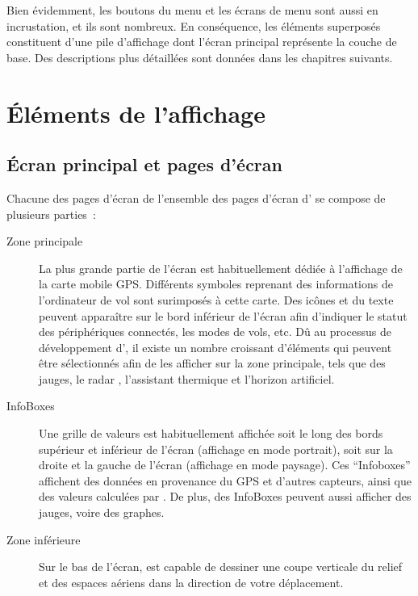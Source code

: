 Bien évidemment, les boutons du menu et les écrans de menu sont aussi en incrustation,
et ils sont nombreux. En conséquence, les éléments superposés constituent d'une pile d'affichage dont
l'écran principal représente la couche de base. Des descriptions plus détaillées sont
données dans les chapitres suivants.

\section{Éléments de l'affichage}
\subsection*{Écran principal et pages d'écran}
Chacune des pages d'écran de l'ensemble des pages d'écran d'\xc{} se compose de plusieurs
parties~:
\begin{description}
\item[Zone principale] La plus grande partie de l'écran est habituellement dédiée à l'affichage
de la carte mobile GPS. Différents symboles reprenant des informations de l'ordinateur de vol sont surimposés
à cette carte. Des icônes et du texte peuvent apparaître sur le bord inférieur de l'écran
afin d'indiquer le statut des périphériques connectés, les modes de vols, etc.
Dû au processus de développement d'\xc{}, il existe un nombre croissant
d'éléments qui peuvent être sélectionnés afin de les afficher sur la zone principale, tels que des jauges,
le radar \fl, l'assistant thermique et l'horizon artificiel.
\item[InfoBoxes] Une grille de valeurs est habituellement affichée soit le long des bords supérieur et inférieur 
de l'écran (affichage en mode portrait), soit sur la droite et la gauche de
l'écran (affichage en mode paysage). Ces ``Infoboxes'' affichent des données en provenance du
GPS et d'autres capteurs, ainsi que des valeurs calculées par \xc. De plus,
des InfoBoxes peuvent aussi afficher des jauges, voire des graphes.
\item[Zone inférieure] Sur le bas de l'écran, \xc{} est capable de dessiner une coupe
verticale du relief et des espaces aériens dans la direction de votre déplacement.
\end{description}


